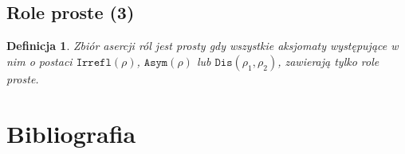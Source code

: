 \documentclass[12pt]{article}
\newtheorem{definicja}{Definicja}
\begin{document}
\subsection{Role proste (3)}
%
\begin{definicja}
Zbiór asercji ról jest prosty gdy wszystkie aksjomaty występujące w nim o postaci $\texttt{Irrefl}(\rho)$, $\texttt{Asym}(\rho)$ lub $\texttt{Dis}(\rho_{1}, \rho_{2})$, zawierają tylko role proste.
\end{definicja}
%




\section{Bibliografia}
\begin{center}


\end{center}
%
\end{document}
